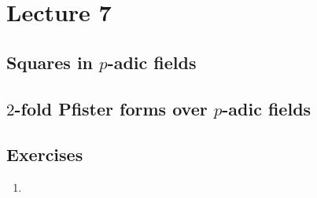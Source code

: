 \documentclass[12pt, leqno, british]{amsart}
\author{Nicolas Daans}
\begin{document}
\section{Lecture 7}

\subsection{Squares in $p$-adic fields}

\subsection{$2$-fold Pfister forms over $p$-adic fields}

\subsection{Exercises}
\begin{enumerate}
\item
\end{enumerate}
\end{document}
